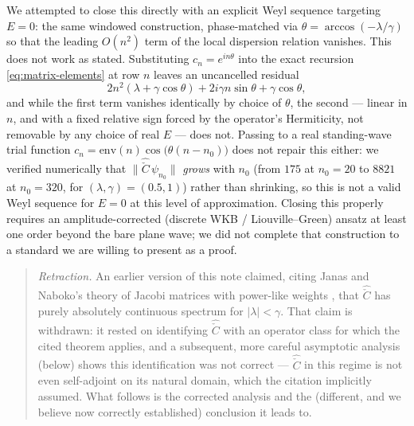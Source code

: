 \documentclass[11pt]{amsart}
\theoremstyle{remark}
\begin{document}
We attempted to close this directly with an explicit Weyl sequence targeting $E=0$: the same windowed construction, phase-matched via $\theta=\arccos(-\lambda/\gamma)$ so that the leading $O(n^2)$ term of the local dispersion relation vanishes. This does not work as stated. Substituting $c_n=e^{in\theta}$ into the exact recursion \eqref{eq:matrix-elements} at row $n$ leaves an uncancelled residual
\[
2n^2(\lambda+\gamma\cos\theta) + 2i\gamma n\sin\theta+\gamma\cos\theta,
\]
and while the first term vanishes identically by choice of $\theta$, the second --- linear in $n$, and with a fixed relative sign forced by the operator's Hermiticity, not removable by any choice of real $E$ --- does not. Passing to a real standing-wave trial function $c_n=\mathrm{env}(n)\cos\big(\theta(n-n_0)\big)$ does not repair this either: we verified numerically that $\|\hat{\check C}\,\psi_{n_0}\|$ \emph{grows} with $n_0$ (from $175$ at $n_0=20$ to $8821$ at $n_0=320$, for $(\lambda,\gamma)=(0.5,1)$) rather than shrinking, so this is not a valid Weyl sequence for $E=0$ at this level of approximation. Closing this properly requires an amplitude-corrected (discrete WKB / Liouville--Green) ansatz at least one order beyond the bare plane wave; we did not complete that construction to a standard we are willing to present as a proof.

\begin{quote}
\textit{Retraction.} An earlier version of this note claimed, citing Janas and Naboko's theory of Jacobi matrices with power-like weights \cite{JanasNabokoPowerLike,JanasNabokoMultithreshold}, that $\hat{\check C}$ has purely absolutely continuous spectrum for $|\lambda|<\gamma$. That claim is withdrawn: it rested on identifying $\hat{\check C}$ with an operator class for which the cited theorem applies, and a subsequent, more careful asymptotic analysis (below) shows this identification was not correct --- $\hat{\check C}$ in this regime is not even self-adjoint on its natural domain, which the citation implicitly assumed. What follows is the corrected analysis and the (different, and we believe now correctly established) conclusion it leads to.
\end{quote}
\end{document}
